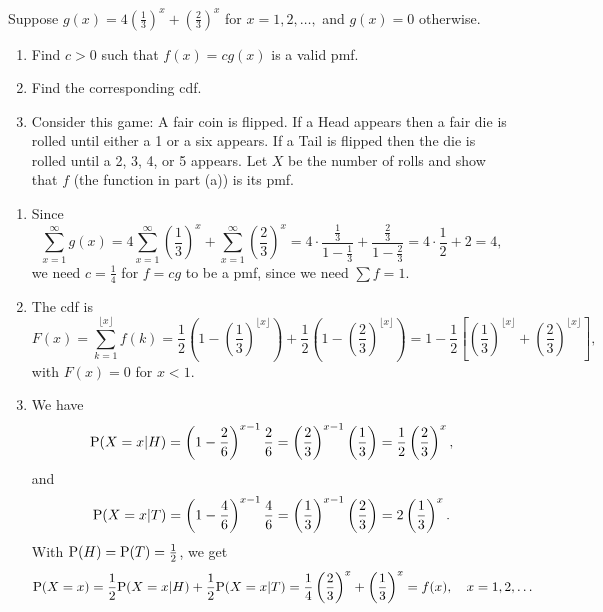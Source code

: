 \documentclass[12pt]{article}
\newcommand{\Prob}{{\rm P}}
\newenvironment{problem}[2][Problem]{\begin{trivlist}
\item[\hskip \labelsep {\bfseries #1}\hskip \labelsep {\bfseries #2.}]}
{\end{trivlist}}
\begin{document}
\begin{problem}{8}
  Suppose $g(x) = 4\left(\frac{1}{3}\right)^x + \left(\frac{2}{3}\right)^x$
  for $x=1,2,\dots,$ and $g(x) = 0$ otherwise.
  \begin{enumerate}
    \item Find $c > 0$ such that $f(x) = cg(x)$ is a valid pmf.
    \item Find the corresponding cdf.
    \item Consider this game: A fair coin is flipped. If a Head appears
    then a fair die is rolled until either a 1 or a six appears. If a
    Tail is flipped then the die is rolled until a 2, 3, 4, or 5 appears.
    Let $X$ be the number of rolls and show that $f$ (the function in part
    (a)) is its pmf.
  \end{enumerate}
  \begin{enumerate}
    \item Since
    \[
      \sum_{x=1}^\infty g(x)=4\sum_{x=1}^\infty\!\left(\frac{1}{3}\right)^x
      +\sum_{x=1}^\infty\!\left(\frac{2}{3}\right)^x
      =4\cdot \frac{\frac{1}{3}}{1-\frac{1}{3}}+\frac{\frac{2}{3}}{1-\frac{2}{3}}
      =4\cdot\frac12+2=4,
    \]
    we need $c=\frac{1}{4}$ for $f = cg$ to be a pmf, since we need
    $\sum f = 1$.
    \item The cdf is
    \[
      F(x)=\sum_{k=1}^{\lfloor x\rfloor} f(k)
      =\frac{1}{2}\!\left(1-\left(\frac{1}{3}\right)^{\lfloor x\rfloor}\right)
      +\frac{1}{2}\!\left(1-\left(\frac{2}{3}\right)^{\lfloor x\rfloor}\right)
      =1-\frac12\!\left[\left(\frac{1}{3}\right)^{\lfloor x\rfloor}
      +\left(\frac{2}{3}\right)^{\lfloor x\rfloor}\right],
    \]
    with $F(x)=0$ for $x<1$. 
    \item We have
    \[
      \Prob(X=x|H)=\left(1-\frac26\right)^{x-1}\frac26
      =\left(\frac23\right)^{x-1}\left(\frac13\right)
      =\frac12\left(\frac23\right)^x,
    \]
    and
    \[
      \Prob(X=x|T)=\left(1-\frac46\right)^{x-1}\frac46
      =\left(\frac13\right)^{x-1}\left(\frac23\right)
      =2\left(\frac13\right)^x.
    \]
    With $\Prob(H)=\Prob(T)=\frac12$, we get
    \[
      \Prob(X=x)=\frac12\Prob(X=x|H)+\frac12\Prob(X=x|T)
      =\frac14\left(\frac23\right)^x+\left(\frac13\right)^x
      =f(x),\quad x=1,2,\dots
    \]
  \end{enumerate}
\end{problem}
\end{document}
